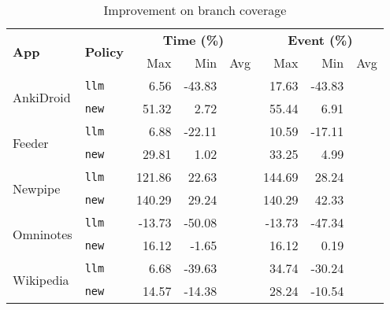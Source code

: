 \documentclass{article}
\begin{document}
\begin{table}[ht]
\centering
\small
\begin{tabular}{llrrrrrr}
\toprule
\multirow{2}{*}{\textbf{App}} & \multirow{2}{*}{\textbf{Policy}} & \multicolumn{3}{c}{\textbf{Time (\%)}} & \multicolumn{3}{c}{\textbf{Event (\%)}} \\
\cmidrule(lr){3-5} \cmidrule(lr){6-8}
& & Max & Min & Avg & Max & Min & Avg \\
\midrule

\multirow{2}{*}{AnkiDroid} 
    & \texttt{llm}  & 6.56  & {-43.83} & \cellcolor{gray!20}{-18.69} & 17.63 & {-43.83} & \cellcolor{gray!20}{-10.45} \\
    & \texttt{new}  & {51.32} & {2.72}   & \cellcolor{gray!20}{32.22}  & {55.44} & {6.91}   & \cellcolor{gray!20}{36.28}  \\
\midrule

\multirow{2}{*}{Feeder} 
    & \texttt{llm}  & 6.88  & {-22.11} & \cellcolor{gray!20}{-15.54} & 10.59 & {-17.11} & \cellcolor{gray!20}{-11.76} \\
    & \texttt{new}  & {29.81} & {1.02}   & \cellcolor{gray!20}{15.87}  & {33.25} & {4.99}   & \cellcolor{gray!20}{22.54}  \\
\midrule

\multirow{2}{*}{Newpipe} 
    & \texttt{llm}  & {121.86} & {22.63}  & \cellcolor{gray!20}{32.71}  & 144.69 & 28.24  & \cellcolor{gray!20}{41.09}  \\
    & \texttt{new}  & {140.29} & {29.24}  & \cellcolor{gray!20}{44.10}  & {140.29} & {42.33}  & \cellcolor{gray!20}{51.83}  \\
\midrule

\multirow{2}{*}{Omninotes} 
    & \texttt{llm}  & -13.73 & {-50.08} & \cellcolor{gray!20}{-39.31} & -13.73 & {-47.34} & \cellcolor{gray!20}{-35.73} \\
    & \texttt{new}  & {16.12}  & {-1.65}  & \cellcolor{gray!20}{3.55}   & {16.12}  & {0.19}   & \cellcolor{gray!20}{9.44}   \\
\midrule

\multirow{2}{*}{Wikipedia} 
    & \texttt{llm}  & 6.68   & {-39.63} & \cellcolor{gray!20}{-15.34} & {34.74}  & -30.24 & \cellcolor{gray!20}{-0.58}  \\
    & \texttt{new}  & {14.57}  & {-14.38} & \cellcolor{gray!20}{1.97}   & 28.24  & {-10.54} & \cellcolor{gray!20}{17.27}  \\
\bottomrule
\end{tabular}
\caption{Improvement on branch coverage}
\label{tab:branch-coverage-improvement}
\end{table}
\end{document}
